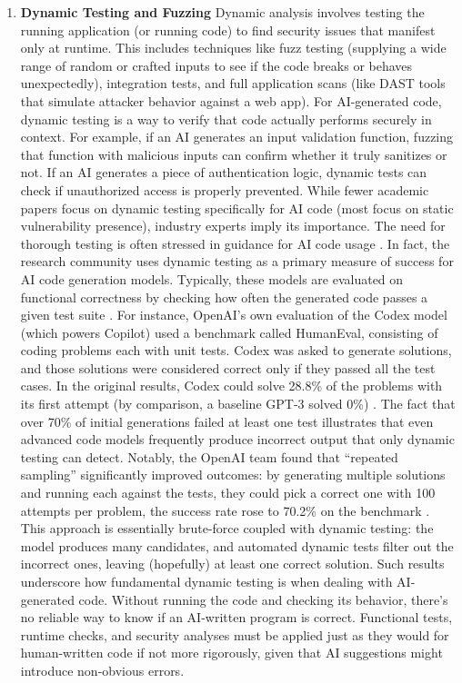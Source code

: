 \begin{enumerate}
    \item \textbf{Dynamic Testing and Fuzzing} Dynamic analysis involves testing the running application (or running code) to find security issues that manifest only at runtime. This includes techniques like fuzz testing (supplying a wide range of random or crafted inputs to see if the code breaks or behaves unexpectedly), integration tests, and full application scans (like DAST tools that simulate attacker behavior against a web app). For AI-generated code, dynamic testing is a way to verify that code actually performs securely in context. For example, if an AI generates an input validation function, fuzzing that function with malicious inputs can confirm whether it truly sanitizes or not. If an AI generates a piece of authentication logic, dynamic tests can check if unauthorized access is properly prevented. While fewer academic papers focus on dynamic testing specifically for AI code (most focus on static vulnerability presence), industry experts imply its importance. The need for thorough testing is often stressed in guidance for AI code usage \cite{dynamictesting}. In fact, the research community uses dynamic testing as a primary measure of success for AI code generation models. Typically, these models are evaluated on functional correctness by checking how often the generated code passes a given test suite \cite{dynamictestingchatgpt}. For instance, OpenAI’s own evaluation of the Codex model (which powers Copilot) used a benchmark called HumanEval, consisting of coding problems each with unit tests. Codex was asked to generate solutions, and those solutions were considered correct only if they passed all the test cases. In the original results, Codex could solve 28.8\% of the problems with its first attempt (by comparison, a baseline GPT-3 solved 0\%) \cite{evaluatingChatgpt}. The fact that over 70\% of initial generations failed at least one test illustrates that even advanced code models frequently produce incorrect output that only dynamic testing can detect. Notably, the OpenAI team found that “repeated sampling” significantly improved outcomes: by generating multiple solutions and running each against the tests, they could pick a correct one with 100 attempts per problem, the success rate rose to 70.2\% on the benchmark \cite{evaluatingChatgpt}. This approach is essentially brute-force coupled with dynamic testing: the model produces many candidates, and automated dynamic tests filter out the incorrect ones, leaving (hopefully) at least one correct solution. Such results underscore how fundamental dynamic testing is when dealing with AI-generated code. Without running the code and checking its behavior, there’s no reliable way to know if an AI-written program is correct. Functional tests, runtime checks, and security analyses must be applied just as they would for human-written code if not more rigorously, given that AI suggestions might introduce non-obvious errors.

\end{enumerate}
